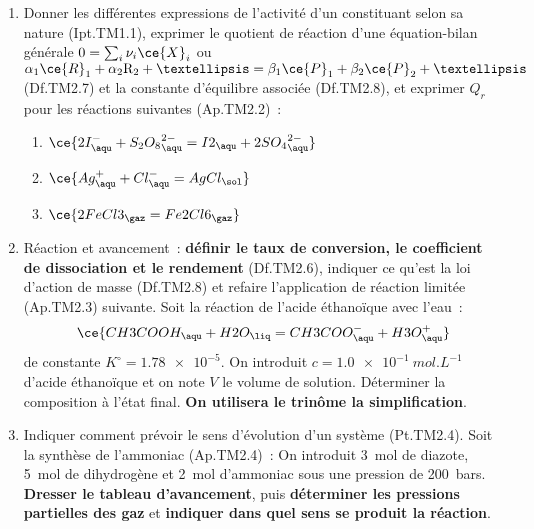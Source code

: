 \documentclass[a4paper, 12pt, final, garamond]{book}
\begin{document}
\begin{enumerate}
	\item Donner les différentes expressions de l'activité d'un constituant selon
	      sa nature (Ipt.TM1.1), exprimer le quotient de réaction d'une
	      équation-bilan générale $0=\sum_i \nu_i{\ce{X}}_i$ ou
	      $\alpha_1{\ce{R}}_1 +
		      \alpha_2{\rm
			      R}_2 + … = \beta_1{\ce{P}}_1 + \beta_2{\ce{P}}_2 + …$ (Df.TM2.7) et
	      la constante d'équilibre associée (Df.TM2.8), et exprimer $Q_r$ pour les
	      réactions suivantes (Ap.TM2.2)~:
	      \begin{enumerate}
		      \item $\ce{2I^-_{\aqu} + {S_2O_8}^{2-}_{\aqu} = I2_{\aqu}
			            +2{SO_4}^{2-}_{\aqu}}$
		      \item $\ce{Ag^+_{\aqu} + Cl^-_{\aqu} = AgCl_{\sol}}$
		      \item $\ce{2FeCl3_{\gaz} = Fe2Cl6_{\gaz}}$
	      \end{enumerate}

	\item Réaction et avancement~: \textbf{définir le taux de conversion,
		      le coefficient de dissociation et le rendement} (Df.TM2.6), indiquer
	      ce qu'est la loi d'action de masse (Df.TM2.8) et refaire l'application
	      de réaction limitée (Ap.TM2.3) suivante. Soit la réaction de l'acide
	      éthanoïque avec l'eau~:
	      \[
		      \ce{CH3COOH_{\aqu} + H2O_{\liq} = CH3COO^{-}_{\aqu} + H3O^{+}_{\aqu}}
	      \]
	      de constante $K^\circ = \num{1.78e-5}$. On introduit
	      $c = \SI{1.0e-1}{mol.L^{-1}}$ d'acide éthanoïque et on note $V$ le
	      volume de solution. Déterminer la composition à l'état final.
	      \textbf{On utilisera le trinôme  la simplification}.

	\item Indiquer comment prévoir le sens d'évolution d'un système (Pt.TM2.4).
	      Soit la synthèse de l'ammoniac (Ap.TM2.4)~:
	      \smallbreak
	      \smallbreak
	      On introduit \SI{3}{mol} de diazote, \SI{5}{mol} de dihydrogène et
	      \SI{2}{mol} d'ammoniac sous une pression de \SI{200}{bars}.
	      \textbf{Dresser le tableau d'avancement}, puis
	      \textbf{déterminer les pressions partielles des gaz} et \textbf{indiquer
		      dans quel sens se produit la réaction}.


\end{enumerate}
\end{document}
